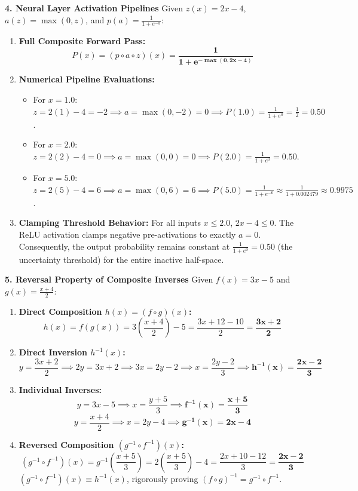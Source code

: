 \textbf{4. Neural Layer Activation Pipelines}
Given $z(x) = 2x - 4$, $a(z) = \max(0, z)$, and $p(a) = \frac{1}{1 + e^{-a}}$:
\begin{enumerate}
    \item \textbf{Full Composite Forward Pass:}
    $$P(x) = (p \circ a \circ z)(x) = \mathbf{\frac{1}{1 + e^{-\max(0, 2x - 4)}}}$$
    \item \textbf{Numerical Pipeline Evaluations:}
    \begin{itemize}
        \item For $x = 1.0$: $z = 2(1) - 4 = -2 \implies a = \max(0, -2) = 0 \implies P(1.0) = \frac{1}{1 + e^0} = \frac{1}{2} = \mathbf{0.50}$.
        \item For $x = 2.0$: $z = 2(2) - 4 = 0 \implies a = \max(0, 0) = 0 \implies P(2.0) = \frac{1}{1 + e^0} = \mathbf{0.50}$.
        \item For $x = 5.0$: $z = 2(5) - 4 = 6 \implies a = \max(0, 6) = 6 \implies P(5.0) = \frac{1}{1 + e^{-6}} \approx \frac{1}{1 + 0.002479} \approx \mathbf{0.9975}$.
    \end{itemize}
    \item \textbf{Clamping Threshold Behavior:} For all inputs $x \le 2.0$, $2x - 4 \le 0$. The ReLU activation clamps negative pre-activations to exactly $a = 0$. Consequently, the output probability remains constant at $\frac{1}{1 + e^0} = 0.50$ (the uncertainty threshold) for the entire inactive half-space.
\end{enumerate}

\textbf{5. Reversal Property of Composite Inverses}
Given $f(x) = 3x - 5$ and $g(x) = \frac{x + 4}{2}$:
\begin{enumerate}
    \item \textbf{Direct Composition $h(x) = (f \circ g)(x)$:}
    $$h(x) = f(g(x)) = 3\left(\frac{x + 4}{2}\right) - 5 = \frac{3x + 12 - 10}{2} = \mathbf{\frac{3x + 2}{2}}$$
    \item \textbf{Direct Inversion $h^{-1}(x)$:}
    $$y = \frac{3x + 2}{2} \implies 2y = 3x + 2 \implies 3x = 2y - 2 \implies x = \frac{2y - 2}{3} \implies \mathbf{h^{-1}(x) = \frac{2x - 2}{3}}$$
    \item \textbf{Individual Inverses:}
    $$y = 3x - 5 \implies x = \frac{y + 5}{3} \implies \mathbf{f^{-1}(x) = \frac{x + 5}{3}}$$
    $$y = \frac{x + 4}{2} \implies x = 2y - 4 \implies \mathbf{g^{-1}(x) = 2x - 4}$$
    \item \textbf{Reversed Composition $(g^{-1} \circ f^{-1})(x)$:}
    $$(g^{-1} \circ f^{-1})(x) = g^{-1}\left( \frac{x + 5}{3} \right) = 2\left(\frac{x + 5}{3}\right) - 4 = \frac{2x + 10 - 12}{3} = \mathbf{\frac{2x - 2}{3}}$$
    $(g^{-1} \circ f^{-1})(x) \equiv h^{-1}(x)$, rigorously proving $(f \circ g)^{-1} = g^{-1} \circ f^{-1}$.
\end{enumerate}

